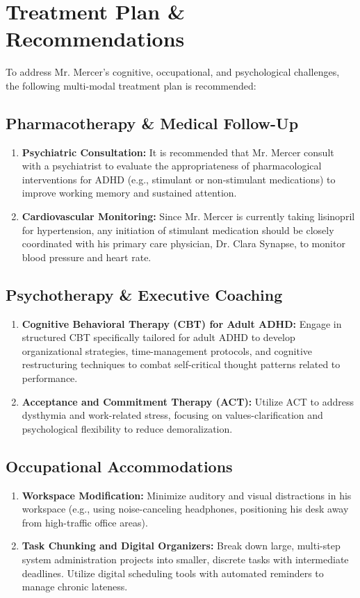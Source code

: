 \section{Treatment Plan \& Recommendations}

To address Mr. Mercer's cognitive, occupational, and psychological challenges, the following multi-modal treatment plan is recommended:

\subsection{Pharmacotherapy \& Medical Follow-Up}
\begin{enumerate}
    \item \textbf{Psychiatric Consultation:} It is recommended that Mr. Mercer consult with a psychiatrist to evaluate the appropriateness of pharmacological interventions for ADHD (e.g., stimulant or non-stimulant medications) to improve working memory and sustained attention.
    \item \textbf{Cardiovascular Monitoring:} Since Mr. Mercer is currently taking lisinopril for hypertension, any initiation of stimulant medication should be closely coordinated with his primary care physician, Dr. Clara Synapse, to monitor blood pressure and heart rate.
\end{enumerate}

\subsection{Psychotherapy \& Executive Coaching}
\begin{enumerate}
    \item \textbf{Cognitive Behavioral Therapy (CBT) for Adult ADHD:} Engage in structured CBT specifically tailored for adult ADHD to develop organizational strategies, time-management protocols, and cognitive restructuring techniques to combat self-critical thought patterns related to performance.
    \item \textbf{Acceptance and Commitment Therapy (ACT):} Utilize ACT to address dysthymia and work-related stress, focusing on values-clarification and psychological flexibility to reduce demoralization.
\end{enumerate}

\subsection{Occupational Accommodations}
\begin{enumerate}
    \item \textbf{Workspace Modification:} Minimize auditory and visual distractions in his workspace (e.g., using noise-canceling headphones, positioning his desk away from high-traffic office areas).
    \item \textbf{Task Chunking and Digital Organizers:} Break down large, multi-step system administration projects into smaller, discrete tasks with intermediate deadlines. Utilize digital scheduling tools with automated reminders to manage chronic lateness.
\end{enumerate}

